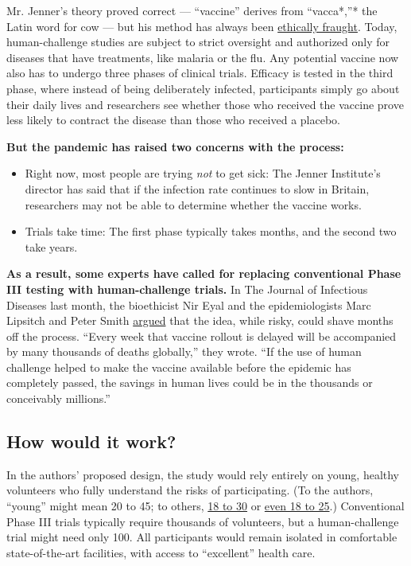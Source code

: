 Mr. Jenner's theory proved correct --- ``vaccine'' derives from
``vacca*,''* the Latin word for cow --- but his method has always been
\href{https://theconversation.com/judging-jenner-was-his-smallpox-experiment-really-unethical-54362}{ethically
fraught}. Today, human-challenge studies are subject to strict oversight
and authorized only for diseases that have treatments, like malaria or
the flu. Any potential vaccine now also has to undergo three phases of
clinical trials. Efficacy is tested in the third phase, where instead of
being deliberately infected, participants simply go about their daily
lives and researchers see whether those who received the vaccine prove
less likely to contract the disease than those who received a placebo.

\textbf{But the pandemic has raised two concerns with the process:}

\begin{itemize}
\item
  Right now, most people are trying \emph{not} to get sick: The Jenner
  Institute's director has said that if the infection rate continues to
  slow in Britain, researchers may not be able to determine whether the
  vaccine works.
\item
  Trials take time: The first phase typically takes months, and the
  second two take years.
\end{itemize}

\textbf{As a result, some experts have called for replacing conventional
Phase III testing with human-challenge trials.} In The Journal of
Infectious Diseases last month, the bioethicist Nir Eyal and the
epidemiologists Marc Lipsitch and Peter Smith
\href{https://academic.oup.com/jid/advance-article/doi/10.1093/infdis/jiaa152/5814216\#201727802}{argued}
that the idea, while risky, could shave months off the process. ``Every
week that vaccine rollout is delayed will be accompanied by many
thousands of deaths globally,'' they wrote. ``If the use of human
challenge helped to make the vaccine available before the epidemic has
completely passed, the savings in human lives could be in the thousands
or conceivably millions.''

\hypertarget{how-would-it-work}{%
\subsection{How would it work?}\label{how-would-it-work}}

In the authors' proposed design, the study would rely entirely on young,
healthy volunteers who fully understand the risks of participating. (To
the authors, ``young'' might mean 20 to 45; to others,
\href{https://www.sciencemag.org/news/2020/03/speed-coronavirus-vaccine-testing-deliberately-infecting-volunteers-not-so-fast-some\#}{18
to 30} or
\href{https://www.vox.com/future-perfect/2020/4/9/21209593/coronavirus-vaccine-human-trials-explained}{even
18 to 25}.) Conventional Phase III trials typically require thousands of
volunteers, but a human-challenge trial might need only 100. All
participants would remain isolated in comfortable state-of-the-art
facilities, with access to ``excellent'' health care.


